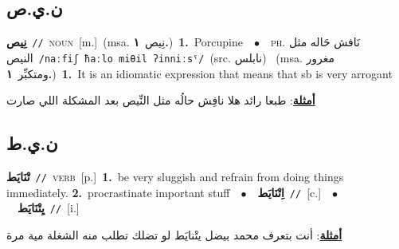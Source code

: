\documentclass[10pt,a4paper,twoside]{article} %
\begin{document}
\begin{multicols}{2}
\vspace{-3mm}
\subsection*{\color{blue}\foreignlanguage{arabic}{ن.ي.ص}\color{blue}{}} 

{\setlength\topsep{0pt}\textbf{\foreignlanguage{arabic}{نِيص}}\ {\color{gray}\texttt{//}\color{black}}\ \textsc{noun}\ [m.]\ \color{gray}(msa. \foreignlanguage{arabic}{نِيص}~\foreignlanguage{arabic}{\textbf{١.}})\color{black}\ \textbf{1.}~Porcupine\ \ $\bullet$\ \ \textsc{ph.} \color{gray} \foreignlanguage{arabic}{نَافش حَاله مثل النيص}\color{black}\ {\color{gray}\texttt{/{\sffamily naːfiʃ ħaːlo miθil ʔinniːsˤ}/}\color{black}}\ \color{gray}(src. \foreignlanguage{arabic}{نابلس})\color{black}\ \color{gray} (msa. \foreignlanguage{arabic}{مغرور ومتكبِّر}~\foreignlanguage{arabic}{\textbf{١.}})\color{black}\ \textbf{1.}~It is an idiomatic expression that means that sb is very arrogant\  \begin{flushright}\color{gray}\foreignlanguage{arabic}{\textbf{\underline{\foreignlanguage{arabic}{أمثلة}}}: طبعا رائد هلا نافِش حالُه مثل النِّيص بعد المشكلة اللي صارت}\end{flushright}\color{black}} \vspace{2mm}

\vspace{-3mm}
\subsection*{\color{blue}\foreignlanguage{arabic}{ن.ي.ط}\color{blue}{}} 

{\setlength\topsep{0pt}\textbf{\foreignlanguage{arabic}{تْنَايَط}}\ {\color{gray}\texttt{//}\color{black}}\ \textsc{verb}\ [p.]\ \textbf{1.}~be very sluggish and refrain from doing things immediately.  \textbf{2.}~procrastinate important stuff\ \ $\bullet$\ \ \setlength\topsep{0pt}\textbf{\foreignlanguage{arabic}{اِتْنَايَط}}\ {\color{gray}\texttt{//}\color{black}}\ [c.]\ \ $\bullet$\ \ \setlength\topsep{0pt}\textbf{\foreignlanguage{arabic}{يِتْنَايَط}}\ {\color{gray}\texttt{//}\color{black}}\ [i.]\  \begin{flushright}\color{gray}\foreignlanguage{arabic}{\textbf{\underline{\foreignlanguage{arabic}{أمثلة}}}: أنت بتعرف محمد بيضل يتْنايَط لو تضلك تطلب منه الشغلة مية مرة}\end{flushright}\color{black}} \vspace{2mm}


\end{multicols}
\end{document}
